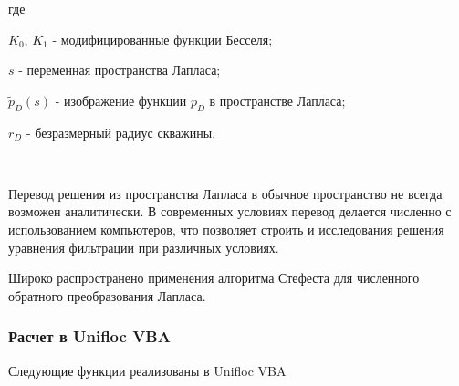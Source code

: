 где 

$K_0$, $K_1$ - модифицированные функции Бесселя;


$s$ - переменная пространства Лапласа;

$\tilde{p}_D(s)$ - изображение функции ${p}_D$ в пространстве Лапласа;

$r_D$ - безразмерный радиус скважины.

\

Перевод решения из пространства Лапласа в обычное пространство не всегда возможен аналитически. В современных условиях перевод делается численно с использованием компьютеров, что позволяет строить и исследования решения уравнения фильтрации при различных условиях. 

Широко распространено применения алгоритма Стефеста для численного обратного преобразования Лапласа. 

\subsubsection{Расчет в Unifloc VBA}

Следующие функции реализованы в Unifloc VBA

